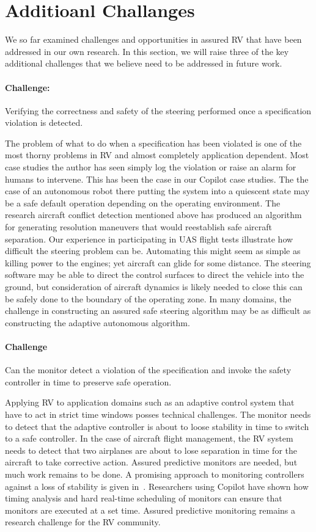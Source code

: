 \section{Additioanl Challanges }\label{sec:future} 
We  so far examined challenges and opportunities in assured  RV that
have been addressed in our own research. In this section, we will
raise  three of the key additional  challenges that we believe need to be
addressed in future work. 


\paragraph{Challenge:}  Verifying the correctness and safety of the
steering performed once a specification violation is detected. 
  
The problem of what to do when a specification has been violated is
one of the most thorny problems in RV and almost completely
application dependent.  Most case studies the author has seen simply
log the violation or raise an alarm for humans to intervene. This has
been the case in our Copilot case studies. The the case of an
autonomous robot there putting the system into a quiescent state may
be a safe default operation depending on the operating environment.
The research aircraft conflict detection mentioned above has produced
an algorithm for generating resolution maneuvers that would
reestablish safe aircraft separation. Our experience in participating
in UAS flight tests illustrate how difficult the steering problem can
be. Automating this might seem as simple as killing power to the
engines; yet aircraft can glide for some distance. The steering
software may be able to direct the control surfaces to direct the
vehicle into the ground, but consideration of aircraft dynamics is
likely needed to close this can be safely done to the boundary of the
operating zone.  In many domains, the challenge in constructing an
assured safe steering algorithm may be as difficult as constructing
the adaptive autonomous algorithm.

\paragraph{Challenge} Can the monitor detect a violation of the specification and invoke the safety controller in time to preserve safe operation.

Applying RV to application domains such as an  adaptive control system
that have to act in strict time windows posses  technical
challenges. The monitor needs to detect  that the adaptive
controller is about to loose stability in time to  switch to a safe
controller. In the case of aircraft flight management, the RV system
needs to detect that  two airplanes are about to lose separation in
time for the aircraft to take corrective action.   Assured predictive
monitors are needed, but much work remains to be done. A promising
approach to monitoring controllers against a loss of stability is
given in~\cite{}. Researchers using Copilot have shown how  timing
analysis and  hard real-time scheduling of monitors can ensure that
monitors are executed at a set time.  Assured predictive monitoring
remains a research challenge for the RV community.



